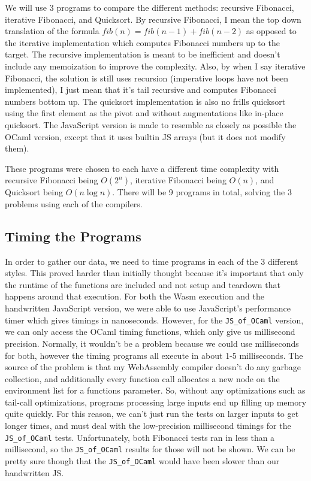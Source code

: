 \documentclass[12pt,a4paper,twoside,openright]{report}
\newcommand{\JSofOCaml}{{\tt JS\_of\_OCaml} }
\begin{document}
We will use 3 programs to compare the different methods: recursive Fibonacci, iterative Fibonacci, and Quicksort.
By recursive Fibonacci, I mean the top down translation of the formula $fib(n) = fib(n-1) + fib(n - 2)$ as opposed to the iterative implementation which computes Fibonacci numbers up to the target.
The recursive implementation is meant to be inefficient and doesn't include any memoization to improve the complexity.
Also, by when I say iterative Fibonacci, the solution is still uses recursion (imperative loops have not been implemented), I just mean that it's tail recursive and computes Fibonacci numbers bottom up.
The quicksort implementation is also no frills quicksort using the first element as the pivot and without augmentations like in-place quicksort.
The JavaScript version is made to resemble as closely as possible the OCaml version, except that it uses builtin JS arrays (but it does not modify them).

These programs were chosen to each have a different time complexity with recursive Fibonacci being $O(2^n)$, iterative Fibonacci being $O(n)$, and Quicksort being $O(n\log{}n)$.
There will be 9 programs in total, solving the 3 problems using each of the compilers.

\subsection{Timing the Programs}
In order to gather our data, we need to time programs in each of the 3 different styles.
This proved harder than initially thought because it's important that only the runtime of the functions are included and not setup and teardown that happens around that execution.
For both the Wasm execution and the handwritten JavaScript version, we were able to use JavaScript's performance timer which gives timings in nanoseconds.
However, for the \JSofOCaml version, we can only access the OCaml timing functions, which only give us millisecond precision.
Normally, it wouldn't be a problem because we could use milliseconds for both, however the timing programs all execute in about 1-5 milliseconds.
The source of the problem is that my WebAssembly compiler doesn't do any garbage collection, and additionally every function call allocates a new node on the environment list for a functions parameter.
So, without any optimizations such as tail-call optimizations, programs processing large inputs end up filling up memory quite quickly.
For this reason, we can't just run the tests on larger inputs to get longer times, and must deal with the low-precision millisecond timings for the \JSofOCaml tests.
Unfortunately, both Fibonacci tests ran in less than a millisecond, so the \JSofOCaml results for those will not be shown.
We can be pretty sure though that the \JSofOCaml would have been slower than our handwritten JS.
\end{document}
